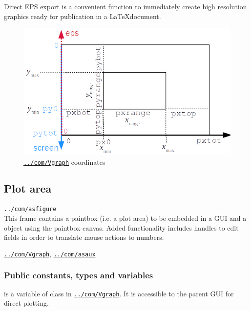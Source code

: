 \documentclass[12pt]{article}
\newcommand\code[1]{{\tt #1}}
\newcommand\guifco[1]{{\color{violet}\code{#1}}}
\newcommand{\opaguif}[1]{\colorbox{violet!30}{\code{#1}}}
\newcommand{\oguifh}[2]{\subsection{\label{#2}#1}{\Huge\opaguif{#2}}\\}
\newcommand{\oguif}[1]{\hyperref[#1]{\opaguif{#1}}}
\newcommand{\opauni}[1]{\colorbox{orange!30}{\code{#1}}}
\newcommand{\ouni}[1]{\hyperref[#1]{\opauni{#1}}}
\newcommand{\uses}[1]{\flushleft {\bf Uses:} #1}
\newcommand{\pvar}[1]{\subsubsection*{Public constants, types and variables} #1}
\newcommand{\feature}[1]{{\color{cadmiumgreen} #1}}
\begin{document}
\feature{Direct EPS export is a convenient function to immediately create high resolution graphics ready for publication in a \LaTeX document.}


\begin{figure}\centering
\includegraphics[scale=0.8]{vplotcoor.png}
\caption{\label{vprange}\oguif{../com/Vgraph} coordinates}
\end{figure}



\oguifh{Plot area}{../com/asfigure}
This frame contains a paintbox (i.e. a plot area) to be embedded in a GUI and a \guifco{Vplot} object using the paintbox canvas. 
Added functionality includes handles to edit fields in order to translate mouse actions to numbers. 

\uses{\oguif{../com/Vgraph}, \ouni{../com/asaux}}

\pvar{
\guifco{plot} is a variable of class \guifco{Vplot} in \oguif{../com/Vgraph}. It is accessible to the parent GUI for direct plotting.

}
\end{document}
